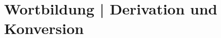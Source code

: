 \documentclass[handout,aspectratio=1610,dvipsnames]{beamer}
\begin{document}
  \section{Wortbildung | Derivation und Konversion}
  \let\woopsi\section\let\section\subsection\let\subsection\subsubsection
  
  \let\subsection\section\let\section\woopsi
  
\end{document}
